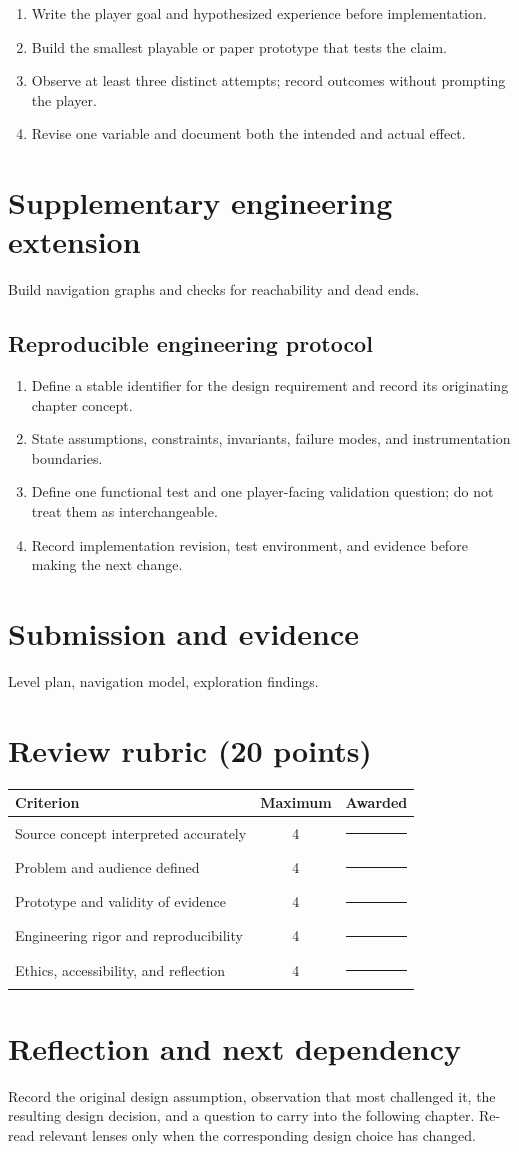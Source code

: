 \documentclass[11pt]{article}
\begin{document}
\begin{enumerate}
\item Write the player goal and hypothesized experience before implementation.
\item Build the smallest playable or paper prototype that tests the claim.
\item Observe at least three distinct attempts; record outcomes without prompting the player.
\item Revise one variable and document both the intended and actual effect.
\end{enumerate}

\section{Supplementary engineering extension}
Build navigation graphs and checks for reachability and dead ends.


\subsection{Reproducible engineering protocol}
\begin{enumerate}
\item Define a stable identifier for the design requirement and record its originating chapter concept.
\item State assumptions, constraints, invariants, failure modes, and instrumentation boundaries.
\item Define one functional test and one player-facing validation question; do not treat them as interchangeable.
\item Record implementation revision, test environment, and evidence before making the next change.
\end{enumerate}

\section{Submission and evidence}
Level plan, navigation model, exploration findings.


\section{Review rubric (20 points)}
\begin{tabularx}{\linewidth}{@{}Xcc@{}}\toprule
Criterion & Maximum & Awarded \\ \midrule
Source concept interpreted accurately & 4 & \rule{0.45in}{0.4pt}\\
Problem and audience defined & 4 & \rule{0.45in}{0.4pt}\\
Prototype and validity of evidence & 4 & \rule{0.45in}{0.4pt}\\
Engineering rigor and reproducibility & 4 & \rule{0.45in}{0.4pt}\\
Ethics, accessibility, and reflection & 4 & \rule{0.45in}{0.4pt}\\\bottomrule
\end{tabularx}

\section{Reflection and next dependency}
Record the original design assumption, observation that most challenged it, the resulting design decision, and a question to carry into the following chapter. Re-read relevant lenses only when the corresponding design choice has changed.
\end{document}
